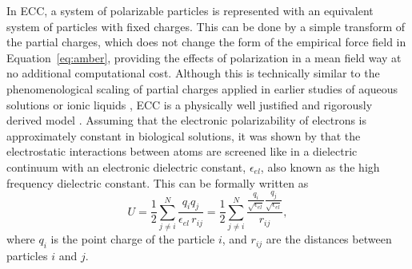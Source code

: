 In ECC, a system of polarizable particles is represented 
with an equivalent system of particles with fixed charges. %
This can be done by a simple transform of the partial charges,
which does not change the form of the empirical force field in Equation~\ref{eq:amber}, 
providing the effects of polarization in a mean field way at no additional computational cost. 
Although this is technically similar to the phenomenological scaling of partial charges 
applied in earlier studies of aqueous solutions or ionic liquids \citep{jonsson86,egberts94,beichel14},
ECC is a physically well justified and rigorously derived model \citep{leontyev09, leontyev10, leontyev11, leontyev14}.
Assuming that the electronic polarizability of electrons is approximately constant in biological solutions, 
it was shown by \citet{leontyev11} that the electrostatic interactions between atoms 
are screened like in a dielectric continuum 
with an electronic dielectric constant, $\epsilon _{el}$, 
also known as the high frequency dielectric constant. 
This can be formally written as
\begin{equation}  \label{eq:coulomb}
   U = \frac{1}{2} \displaystyle \sum ^N _{j\neq i} \frac{q_i q_j}{\epsilon_{el} \, r_{ij}}  =  \frac{1}{2} \displaystyle \sum ^N _{j\neq i} \frac{\frac{q_i}{\sqrt{\epsilon _{el}}} \frac{q_j}{\sqrt{\epsilon _{el}}}}{r_{ij}}  , 
\end{equation} 
where $q_i$ is the point charge of the particle $i$,
and $r_{ij}$ are the distances between particles $i$ and $j$.
